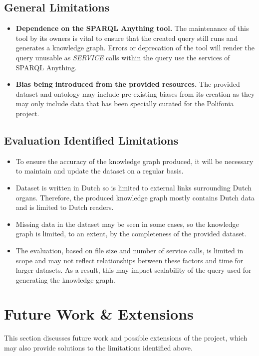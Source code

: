 \subsection{General Limitations}
\begin{itemize}
    \item \textbf{Dependence on the SPARQL Anything tool.} The maintenance of this tool by its owners is vital to ensure that the created query still runs and generates a knowledge graph. Errors or deprecation of the tool will render the query unusable as \textit{SERVICE} calls within the query use the services of SPARQL Anything. 
    \item \textbf{Bias being introduced from the provided resources.} The provided dataset and ontology may include pre-existing biases from its creation as they may only include data that has been specially curated for the Polifonia project. 
\end{itemize}

\subsection{Evaluation Identified Limitations}
\begin{itemize}
    \item To ensure the accuracy of the knowledge graph produced, it will be necessary to maintain and update the dataset on a regular basis.
    \item Dataset is written in Dutch so is limited to external links surrounding Dutch organs. Therefore, the produced knowledge graph mostly contains Dutch data and is limited to Dutch readers.  
    \item Missing data in the dataset may be seen in some cases, so the knowledge graph is limited, to an extent, by the completeness of the provided dataset.
    \item  The evaluation, based on file size and number of service calls, is limited in scope and may not reflect relationships between these factors and time for larger datasets. As a result, this may impact scalability of the query used for generating the knowledge graph.
\end{itemize}

\section{Future Work \& Extensions}
This section discusses future work and possible extensions of the project, which may also provide solutions to the limitations identified above.

